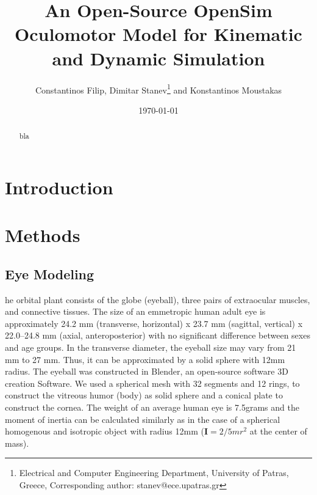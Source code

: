 \documentclass[11pt,a4paper,draft=false]{report}
\title{An Open-Source OpenSim Oculomotor Model for Kinematic and Dynamic
  Simulation}
\author{Constantinos Filip, Dimitar Stanev\footnote{Electrical and Computer
    Engineering Department, University of Patras, Greece, Corresponding author:
    stanev@ece.upatras.gr} and Konstantinos Moustakas}
\date{\today}
\newcommand{\mat}[1]{\bm{#1}}
\begin{document}

\maketitle

\begin{abstract}
  bla
\end{abstract}

\section*{Introduction}\label{sec:introduction}

\section*{Methods}\label{sec:methods}

\subsection*{Eye Modeling}\label{sec:eye-Modeling}

he orbital plant consists of the globe (eyeball), three pairs of extraocular
muscles, and connective tissues. The size of an emmetropic human adult eye is
approximately 24.2 mm (transverse, horizontal) x 23.7 mm (sagittal, vertical) x
22.0–24.8 mm (axial, anteroposterior) with no significant difference between
sexes and age groups. In the transverse diameter, the eyeball size may vary from
21 mm to 27 mm. Thus, it can be approximated by a solid sphere with 12mm
radius. The eyeball was constructed in Blender, an open-source software 3D
creation Software. We used a spherical mesh with 32 segments and 12 rings, to
construct the vitreous humor (body) as solid sphere and a conical plate to
construct the cornea. The weight of an average human eye is 7.5grams and the
moment of inertia can be calculated similarly as in the case of a spherical
homogenous and isotropic object with radius 12mm ($\mat{I} = 2/5 m r^2$ at the
center of mass).

\end{document}
